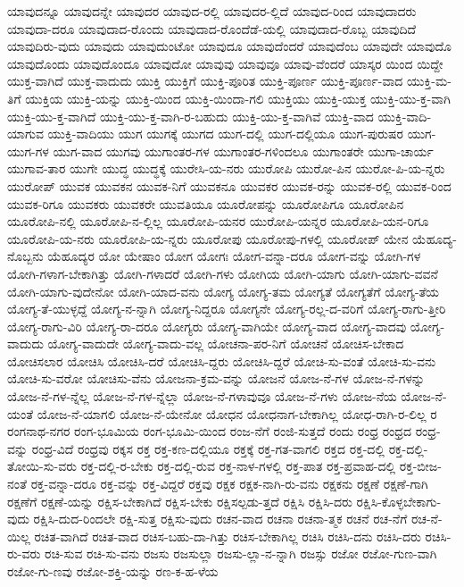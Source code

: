 {ಯಾವುದನ್ನೂ
ಯಾವುದನ್ನೇ
ಯಾವುದರ
ಯಾವುದ-ರಲ್ಲಿ
ಯಾವುದರ-ಲ್ಲಿದೆ
ಯಾವುದ-ರಿಂದ
ಯಾವುದಾದರು
ಯಾವುದಾ-ದರೂ
ಯಾವುದಾದ-ರೊಂದು
ಯಾವುದಾದ-ರೊಂದೆಡೆ-ಯಲ್ಲಿ
ಯಾವುದಾದ-ರೊಬ್ಬ
ಯಾವುದಿದೆ
ಯಾವುದಿರು-ವುದು
ಯಾವುದು
ಯಾವುದುಂಟೋ
ಯಾವುದೂ
ಯಾವುದೆಂದರೆ
ಯಾವುದೆಂಬ
ಯಾವುದೇ
ಯಾವುದೊ
ಯಾವುದೊಂದು
ಯಾವುದೊಂದೂ
ಯಾವುದೋ
ಯಾವುವು
ಯಾವುವೂ
ಯಾವು-ವೆಂದರೆ
ಯಾಸ್ಕರ
ಯಿಂದ
ಯಿದ್ದೇ
ಯುಕ್ತ-ವಾಗಿದೆ
ಯುಕ್ತ-ವಾದುದು
ಯುಕ್ತಿ
ಯುಕ್ತಿಗೆ
ಯುಕ್ತಿ-ಪೂರಿತ
ಯುಕ್ತಿ-ಪೂರ್ಣ
ಯುಕ್ತಿ-ಪೂರ್ಣ-ವಾದ
ಯುಕ್ತಿ-ಮ-ತಿಗೆ
ಯುಕ್ತಿಯ
ಯುಕ್ತಿ-ಯನ್ನು
ಯುಕ್ತಿ-ಯಿಂದ
ಯುಕ್ತಿ-ಯಿಂದಾ-ಗಲಿ
ಯುಕ್ತಿಯು
ಯುಕ್ತಿ-ಯುಕ್ತ
ಯುಕ್ತಿ-ಯು-ಕ್ತ-ವಾಗಿ
ಯುಕ್ತಿ-ಯು-ಕ್ತ-ವಾಗಿದೆ
ಯುಕ್ತಿ-ಯು-ಕ್ತ-ವಾಗಿ-ರ-ಬಹುದು
ಯುಕ್ತಿ-ಯು-ಕ್ತ-ವಾಗಿವೆ
ಯುಕ್ತಿ-ವಾದ
ಯುಕ್ತಿ-ವಾದಿ-ಯಾಗುವ
ಯುಕ್ತಿ-ವಾದಿಯು
ಯುಗ
ಯುಗಕ್ಕೆ
ಯುಗದ
ಯುಗ-ದಲ್ಲಿ
ಯುಗ-ದಲ್ಲಿಯೂ
ಯುಗ-ಪುರುಷರ
ಯುಗ-ಯುಗ-ಗಳ
ಯುಗ-ವಾದ
ಯುಗವು
ಯುಗಾಂತರ-ಗಳ
ಯುಗಾಂತರ-ಗಳಿಂದಲೂ
ಯುಗಾಂತರೇ
ಯುಗಾ-ಚಾರ್ಯ
ಯುಗಾವ-ತಾರ
ಯುಗೇ
ಯುದ್ಧ
ಯುದ್ಧಕ್ಕೆ
ಯುರೇಸಿ-ಯ-ನರು
ಯುರೋಪಿ
ಯುರೋ-ಪಿನ
ಯುರೋ-ಪಿ-ಯ-ನ್ನರು
ಯುರೋಪ್
ಯುವಕ
ಯುವಕನ
ಯುವಕ-ನಿಗೆ
ಯುವಕನೂ
ಯುವಕರ
ಯುವಕ-ರನ್ನು
ಯುವಕ-ರಲ್ಲಿ
ಯುವಕ-ರಿಂದ
ಯುವಕ-ರಿಗೂ
ಯುವಕರು
ಯುವಕರೇ
ಯುವತಿಯೂ
ಯೂರೋಪನ್ನು
ಯೂರೋಪಿಗೂ
ಯೂರೋಪಿನ
ಯೂರೋಪಿ-ನಲ್ಲಿ
ಯೂರೋಪಿ-ನ-ಲ್ಲಿಲ್ಲ
ಯೂರೋಪಿ-ಯನರ
ಯುರೋಪಿ-ಯನ್ನರ
ಯೂರೋಪಿ-ಯನ-ರಿಗೂ
ಯೂರೋಪಿ-ಯ-ನರು
ಯೂರೋಪಿ-ಯ-ನ್ನರು
ಯೂರೋಪು
ಯೂರೋಪು-ಗಳಲ್ಲಿ
ಯೂರೋಪ್
ಯೇನ
ಯೆಹೂದ್ಯ-ನೊಬ್ಬನು
ಯೆಹೂದ್ಯರ
ಯೋ
ಯೇಷಾಂ
ಯೋಗ
ಯೋಗಃ
ಯೋಗ-ವನ್ನಾ-ದರೂ
ಯೋಗ-ವನ್ನು
ಯೋಗಿ-ಗಳ
ಯೋಗಿ-ಗಳಾಗ-ಬೇಕಾಗಿತ್ತು
ಯೋಗಿ-ಗಳಾದರೆ
ಯೋಗಿ-ಗಳು
ಯೋಗಿಯ
ಯೋಗಿ-ಯಾಗು
ಯೋಗಿ-ಯಾಗು-ವವನೆ
ಯೋಗಿ-ಯಾಗು-ವುದೇನೋ
ಯೋಗಿ-ಯಾದ-ವನು
ಯೋಗ್ಯ
ಯೋಗ್ಯ-ತಮ
ಯೋಗ್ಯತೆ
ಯೋಗ್ಯತೆಗೆ
ಯೋಗ್ಯ-ತೆಯ
ಯೋಗ್ಯ-ತೆ-ಯುಳ್ಳದ್ದೆ
ಯೋಗ್ಯ-ನ-ನ್ನಾಗಿ
ಯೋಗ್ಯ-ನಿದ್ದರೂ
ಯೋಗ್ಯನೇ
ಯೋಗ್ಯ-ರಲ್ಲ-ದ-ವರಿಗೆ
ಯೋಗ್ಯ-ರಾಗು-ತ್ತೀರಿ
ಯೋಗ್ಯ-ರಾಗು-ವಿರಿ
ಯೋಗ್ಯ-ರಾ-ದರೂ
ಯೋಗ್ಯರು
ಯೋಗ್ಯ-ವಾಗಿಯೇ
ಯೋಗ್ಯ-ವಾದ
ಯೋಗ್ಯ-ವಾದವು
ಯೋಗ್ಯ-ವಾದುದು
ಯೋಗ್ಯ-ವಾದುದೇ
ಯೋಗ್ಯ-ವಾದು-ವಲ್ಲ
ಯೋಚನಾ-ಪರ-ನಿಗೆ
ಯೋಚನೆ
ಯೋಚಿಸ-ಬೇಕಾದ
ಯೋಚಿಸಲಾರ
ಯೋಚಿಸಿ
ಯೋಚಿಸಿ-ದರೆ
ಯೋಚಿಸಿ-ದ್ದರು
ಯೋಚಿಸಿ-ದ್ದರೆ
ಯೋಚಿ-ಸು-ವಂತೆ
ಯೋಚಿ-ಸು-ವನು
ಯೋಚಿ-ಸು-ವರೋ
ಯೋಚಿಸು-ವೆನು
ಯೋಜನಾ-ಕ್ರಮ-ವನ್ನು
ಯೋಜನೆ
ಯೋಜ-ನೆ-ಗಳ
ಯೋಜ-ನೆ-ಗಳನ್ನು
ಯೋಜ-ನೆ-ಗಳ-ನ್ನೆಲ್ಲ
ಯೋಜ-ನೆ-ಗಳ-ನ್ನೆಲ್ಲಾ
ಯೋಜ-ನೆ-ಗಳಾವುವೂ
ಯೋಜ-ನೆ-ಗಳು
ಯೋಜ-ನೆಯ
ಯೋಜ-ನೆ-ಯಂತೆ
ಯೋಜ-ನೆ-ಯಾಗಲಿ
ಯೋಜ-ನೆ-ಯೇನೋ
ಯೋಧನ
ಯೋಧನಾಗ-ಬೇಕಾಗಿಲ್ಲ
ಯೋಧ-ರಾಗಿ-ರ-ಲಿಲ್ಲ
ರ
ರಂಗನಾಥ-ನಗರ
ರಂಗ-ಭೂಮಿಯ
ರಂಗ-ಭೂಮಿ-ಯಿಂದ
ರಂಜ-ನೆಗೆ
ರಂಜಿ-ಸುತ್ತದೆ
ರಂದು
ರಂಧ್ರ
ರಂಧ್ರದ
ರಂಧ್ರ-ವನ್ನು
ರಂಧ್ರ-ವಿದೆ
ರಂಧ್ರವು
ರಕ್ಕಸ
ರಕ್ತ
ರಕ್ತ-ಕಣ-ದಲ್ಲಿಯೂ
ರಕ್ತಕ್ಕೆ
ರಕ್ತ-ಗತ-ವಾಗಲಿ
ರಕ್ತದ
ರಕ್ತ-ದಲ್ಲಿ
ರಕ್ತ-ದಲ್ಲಿ-ತೋಯಿ-ಸು-ವರು
ರಕ್ತ-ದಲ್ಲಿ-ರ-ಬೇಕು
ರಕ್ತ-ದಲ್ಲಿ-ರುವ
ರಕ್ತ-ನಾಳ-ಗಳಲ್ಲಿ
ರಕ್ತ-ಪಾತ
ರಕ್ತ-ಪ್ರವಾಹ-ದಲ್ಲಿ
ರಕ್ತ-ಬೀಜ-ನಂತೆ
ರಕ್ತ-ವನ್ನಾ-ದರೂ
ರಕ್ತ-ವನ್ನು
ರಕ್ತ-ವಿದ್ದರೆ
ರಕ್ತವು
ರಕ್ಷಕ
ರಕ್ಷಕ-ನಾಗಿ-ರು-ವನು
ರಕ್ಷಕನು
ರಕ್ಷಣೆ
ರಕ್ಷಣೆ-ಗಾಗಿ
ರಕ್ಷಣೆಗೆ
ರಕ್ಷಣೆ-ಯನ್ನು
ರಕ್ಷಿಸ-ಬೇಕಾಗಿದೆ
ರಕ್ಷಿಸ-ಬೇಕು
ರಕ್ಷಿಸಲ್ಪಡು-ತ್ತದೆ
ರಕ್ಷಿಸಿ
ರಕ್ಷಿಸಿ-ದರು
ರಕ್ಷಿಸಿ-ಕೊಳ್ಳಬೇಕಾಗು-ವುದು
ರಕ್ಷಿಸಿ-ದುದ-ರಿಂದಲೇ
ರಕ್ಷಿ-ಸುತ್ತ
ರಕ್ಷಿಸು-ವುದು
ರಚನ-ವಾದ
ರಚನಾ
ರಚನಾ-ತ್ಮಕ
ರಚನೆ
ರಚ-ನೆಗೆ
ರಚ-ನೆ-ಯಿಲ್ಲ
ರಚಿತ-ವಾಗಿದೆ
ರಚಿತ-ವಾದ
ರಚಿಸ-ಬಹು-ದಾ-ಗಿತ್ತು
ರಚಿಸ-ಬೇಕಾಗಿಲ್ಲ
ರಚಿಸಿ
ರಚಿಸಿ-ದನು
ರಚಿಸಿ-ದರು
ರಚಿಸಿ-ರು-ವರು
ರಚಿ-ಸುವ
ರಚಿ-ಸು-ವನು
ರಜಸು
ರಜಸುಲ್ಲಾ
ರಜಸು-ಲ್ಲಾ-ನ-ನ್ನಾಗಿ
ರಜಸ್ಸು
ರಜೋ
ರಜೋ-ಗುಣ-ವಾಗಿ
ರಜೋ-ಗು-ಣವು
ರಜೋ-ಶಕ್ತಿ-ಯನ್ನು
ರಣ-ಕ-ಹ-ಳೆಯ
}
